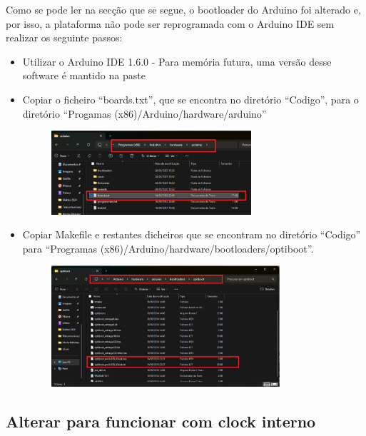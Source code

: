 \documentclass{article}
\begin{document}
Como se pode ler na secção que se segue, o bootloader do Arduino foi alterado e, por isso, a plataforma não pode ser reprogramada com o Arduino IDE sem realizar os seguinte passos:
\begin{itemize}
\item 
Utilizar o Arduino IDE 1.6.0 - Para memória futura, uma versão desse software é mantido na paste
\item
Copiar o ficheiro ``boards.txt'', que se encontra no diretório ``Codigo'', para o diretório ``Progamas (x86)/Arduino/hardware/arduino''
\begin{figure}[htb!]
\centering
\includegraphics[width=0.7\textwidth]{Figuras/Fig31.png}
\label{fig:fig31}
\end{figure}
\item
Copiar Makefile e restantes dicheiros que se encontram no diretório ``Codigo'' para ``Programas (x86)/Arduino/hardware/bootloaders/optiboot''.
\begin{figure}[htb!]
\centering
\includegraphics[width=0.8\textwidth]{Figuras/Fig30.png}
\label{fig:fig30}
\end{figure}
\end{itemize}
%
\subsection{Alterar para funcionar com clock interno}
\end{document}
